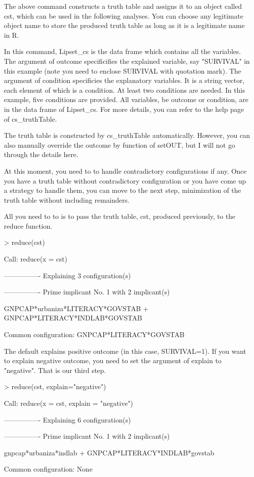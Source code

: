 \documentclass[a4paper]{article}
\begin{document}
The above command constructs a truth table and assigns it to an object
called cst, which can be used in the following analyses. You can
choose any legitimate object name to store the produced truth table as long as it is a
legitimate name in R.

In this command, Lipset_cs is the data frame which contains all the variables. The
argument of outcome specificifies the explained variable, say "SURVIVAL"
in this example (note you need to enclose SURVIVAL with
quotation mark). The argument of condition specificies the explanatory
variables. It is a string vector, each element of which is a
condition. At least two conditions are needed. In this example, five
conditions are provided. All variables, be outcome or condition, are
in the data frame of Lipset_cs. For more details, you can refer to the
help page of cs_truthTable.

The truth table is constructed by cs_truthTable automatically.
However, you can also manually override the outcome by function of
setOUT, but I will not go through the details here.

At this moment, you  need to to handle contradictory
configurations if any. Once you have a truth table without
contradictory configuration or you have come up a strategy to handle
them, you can move to the next step, minimization of the truth table without including remainders.

All you need to to is to pass the truth table, cst, produced previously, to the reduce function.
\begin{Schunk}
\begin{Sinput}
> reduce(cst)
\end{Sinput}
\begin{Soutput}
Call:
reduce(x = cst)


----------------
Explaining 3 configuration(s)

----------------
Prime implicant No. 1 with 2 implicant(s)

GNPCAP*urbaniza*LITERACY*GOVSTAB + GNPCAP*LITERACY*INDLAB*GOVSTAB

Common configuration: GNPCAP*LITERACY*GOVSTAB
\end{Soutput}
\end{Schunk}

The default explains positive outcome (in this case,
SURVIVAL=1). If you want to explain negative outcome, you need to set
the argument of explain to "negative". That is our third step.

\begin{Schunk}
\begin{Sinput}
> reduce(cst, explain="negative")
\end{Sinput}
\begin{Soutput}
Call:
reduce(x = cst, explain = "negative")


----------------
Explaining 6 configuration(s)

----------------
Prime implicant No. 1 with 2 implicant(s)

gnpcap*urbaniza*indlab + GNPCAP*LITERACY*INDLAB*govstab

Common configuration: None
\end{Soutput}
\end{Schunk}
\end{document}
